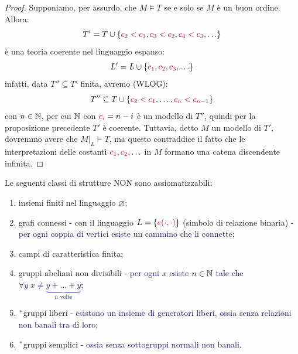 \begin{proof}
    Supponiamo, per assurdo, che $M \models T$ se e solo se $M$ è un buon ordine. Allora:
    \[ T' = T \cup \{\textcolor{purple}{c_2 < c_1}, \textcolor{purple}{c_3 < c_2}, \textcolor{purple}{c_4 < c_3}, \ldots\}
    \]
    è una teoria coerente nel linguaggio espanso:
    \[ L' = L \cup \{\textcolor{purple}{c_1}, \textcolor{purple}{c_2}, \textcolor{purple}{c_3}, \ldots\}
    \]
    infatti, data $T'' \subseteq T'$ finita, avremo (WLOG):
    \[ T'' \subseteq T \cup \{\textcolor{purple}{c_2 < c_1}, \ldots, \textcolor{purple}{c_n < c_{n-1}}\}
    \]
    con $n \in \mathbb N$, per cui $\mathbb N$ con $\textcolor{purple}{c_i} = n - i$ è un modello di $T''$, quindi per la proposizione precedente $T'$ è coerente.
    Tuttavia, detto $M$ un modello di $T'$, dovremmo avere che $M|_{L}\models T$, ma questo contraddice il fatto che le interpretazioni delle costanti $\textcolor{purple}{c_1}, \textcolor{purple}{c_2}, \ldots$ in $M$
    formano una catena discendente infinita.
\end{proof}

\begin{exercise}
    Le seguenti classi di strutture NON sono assiomatizzabili:
    \begin{enumerate}
        \item insiemi finiti nel linguaggio $\varnothing$;
        \item grafi connessi - con il linguaggio $L = \{\textcolor{purple}{e(\cdot,\cdot)}\}$ (simbolo di relazione binaria) \textcolor{MidnightBlue}{- per ogni coppia di vertici esiste un cammino che li connette};
        \item campi di caratteristica finita;
        \item gruppi abeliani non divisibili \textcolor{MidnightBlue}{- per ogni $x$ esiste $n \in \mathbb N$ tale che $\forall y \; x \ne \underbrace{y+\ldots + y}_{n\text{ volte}}$};
        \item $\textcolor{purple}{{}^*}$gruppi liberi \textcolor{MidnightBlue}{- esistono un insieme di generatori liberi, ossia senza relazioni non banali tra di loro};
        \item $\textcolor{purple}{{}^*}$gruppi semplici \textcolor{MidnightBlue}{- ossia senza sottogruppi normali non banali}.
    \end{enumerate}
\end{exercise}

